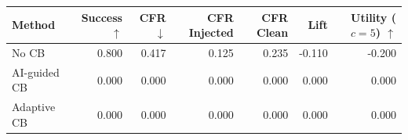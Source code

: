 \begin{tabular}{lrrrrrr}
\toprule
Method & Success $\uparrow$ & CFR $\downarrow$ & CFR Injected & CFR Clean & Lift & Utility ($c=5$) $\uparrow$ \\
\midrule
No CB & 0.800 & 0.417 & 0.125 & 0.235 & -0.110 & -0.200 \\
AI-guided CB & 0.000 & 0.000 & 0.000 & 0.000 & 0.000 & 0.000 \\
Adaptive CB & 0.000 & 0.000 & 0.000 & 0.000 & 0.000 & 0.000 \\
\bottomrule
\end{tabular}
